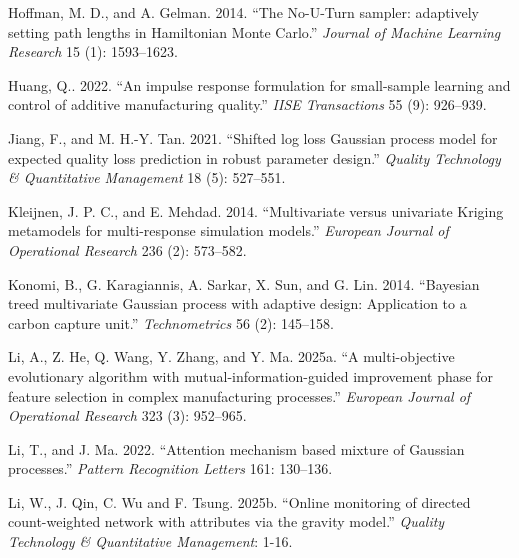 \documentclass[]{interact}
\theoremstyle{plain}%
\theoremstyle{definition}
\theoremstyle{remark}
\begin{document}
\begin{thebibliography}{}
Hoffman, M. D., and A. Gelman. 2014. ``The No-U-Turn sampler: adaptively setting path lengths in Hamiltonian Monte Carlo.'' \emph{Journal of Machine Learning Research} 15 (1): 1593--1623.

Huang, Q.. 2022. ``An impulse response formulation for small-sample learning and control of additive manufacturing quality.'' \emph{IISE Transactions} 55 (9): 926--939.

Jiang, F., and M. H.-Y. Tan. 2021. ``Shifted log loss Gaussian process model for expected quality loss prediction in robust parameter design.'' \emph{Quality Technology \& Quantitative Management} 18 (5): 527--551.


Kleijnen, J. P. C., and E. Mehdad. 2014. ``Multivariate versus univariate Kriging metamodels for multi-response simulation models.'' \emph{European Journal of Operational Research} 236 (2): 573--582.


Konomi, B., G. Karagiannis, A. Sarkar, X. Sun, and G. Lin. 2014. ``Bayesian treed multivariate Gaussian process with adaptive design: Application to a carbon capture unit.'' \emph{Technometrics} 56 (2): 145--158.


Li, A., Z. He, Q. Wang, Y. Zhang, and Y. Ma. 2025a. ``A multi-objective evolutionary algorithm with mutual-information-guided improvement phase for feature selection in complex manufacturing processes.'' \emph{European Journal of Operational Research} 323 (3): 952--965.


Li, T., and J. Ma. 2022. ``Attention mechanism based mixture of Gaussian processes.'' \emph{Pattern Recognition Letters} 161: 130--136.

Li, W., J. Qin, C. Wu and F. Tsung. 2025b. ``Online monitoring of directed count-weighted network with attributes via the gravity model.''  \emph{Quality Technology \& Quantitative Management}: 1-16.



\end{thebibliography}
\end{document}
